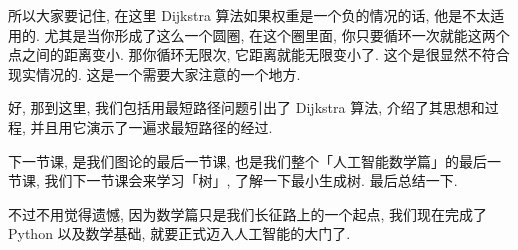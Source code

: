 所以大家要记住, 在这里 Dijkstra 算法如果权重是一个负的情况的话, 他是不太适用的. 尤其是当你形成了这么一个圆圈, 在这个圈里面, 你只要循环一次就能这两个点之间的距离变小. 那你循环无限次, 它距离就能无限变小了. 这个是很显然不符合现实情况的. 这是一个需要大家注意的一个地方. 

好, 那到这里, 我们包括用最短路径问题引出了 Dijkstra 算法, 介绍了其思想和过程, 并且用它演示了一遍求最短路径的经过. 

下一节课, 是我们图论的最后一节课, 也是我们整个「人工智能数学篇」的最后一节课, 我们下一节课会来学习「树」, 了解一下最小生成树. 最后总结一下. 

不过不用觉得遗憾, 因为数学篇只是我们长征路上的一个起点, 我们现在完成了 Python 以及数学基础, 就要正式迈入人工智能的大门了. 